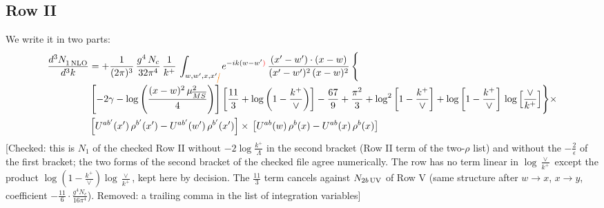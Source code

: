 \documentclass[9pt]{article}
\numberwithin{equation}{section}
\begin{document}
\subsection{Row II}
We write it in two parts:
\begin{align}
     \frac{d^{3}N_{1\,\rm NLO}^{\rm}}{d^{3}k} &  =  +\frac{1}{(2\pi)^{3}}\, \frac{g^{4}\,N_{c}}{32\pi^{4}}\,\frac{1}{k^{+}}\, \int_{w, w',x,x'{\color{orange}\cancel{,}}} e^{-ik(w-w^\prime{\color{red})}}\, \frac{(x'-w')\cdot (x-w)}{(x'-w')^{2}\, (x-w)^{2}}\, \Bigg\{ \notag \\ & \left[-2\gamma-\log{\left(\frac{(x-w)^{2}\,\mu^{2}_{\overline{MS}}}{4}\right)}\right]\left[\frac{11}{3}+\log{\left(1-\frac{k^{+}}{\vee}\right)}\right]-\frac{67}{9}+\frac{\pi^{2}}{3}+\log^{2}{\left[1-\frac{k^{+}}{\vee}\right]}+\log{\left[1-\frac{k^{+}}{\vee}\right]}\,\log{\left[\frac{\vee}{k^{+}}\right]}\Bigg\}\times\notag \\ & \left[U^{ab'}(x')\,\rho^{b'}(x') - U^{ab'}(w')\,\rho^{b'}(x')\right]\times\,\left[U^{ab}(w)\,\rho^{b}(x) - U^{ab}(x)\,\rho^{b}(x)\right]
\end{align} {\color{red}[Checked: this is $N_{1}$ of the checked Row II without $-2\log\frac{k^{+}}{\Lambda}$ in the second bracket (Row II term of the two-$\rho$ list) and without the $-\frac{2}{\epsilon}$ of the first bracket; the two forms of the second bracket of the checked file agree numerically. The row has no term linear in $\log\frac{\vee}{k^{+}}$ except the product $\log(1-\frac{k^{+}}{\vee})\log\frac{\vee}{k^{+}}$, kept here by decision. The $\frac{11}{3}$ term cancels against $N_{2b\,\rm UV}$ of Row V (same structure after $w\to x$, $x\to y$, coefficient $-\frac{11}{6}\cdot\frac{g^{4}N_{c}}{16\pi^{4}}$). Removed: a trailing comma in the list of integration variables]}\par\noindent
\end{document}
